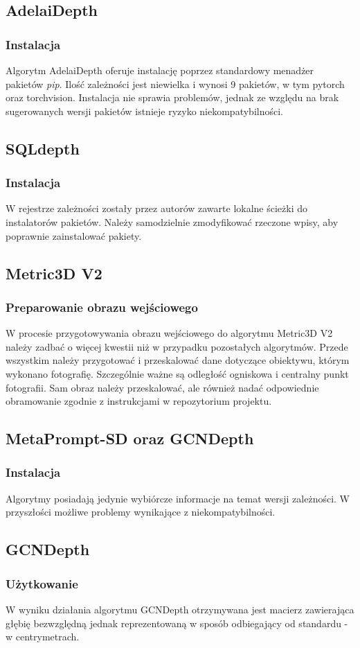 \subsection{AdelaiDepth}
\subsubsection{Instalacja}
Algorytm AdelaiDepth oferuje instalację poprzez standardowy menadżer pakietów \textit{pip}. Ilość zależności jest niewielka i wynosi 9 pakietów, w tym pytorch oraz torchvision. Instalacja nie sprawia problemów, jednak ze względu na brak sugerowanych wersji pakietów istnieje ryzyko niekompatybilności.

\subsection{SQLdepth}
\subsubsection{Instalacja}
W rejestrze zależności zostały przez autorów zawarte lokalne ścieżki do instalatorów pakietów. Należy samodzielnie zmodyfikować rzeczone wpisy, aby poprawnie zainstalować pakiety.

\subsection{Metric3D V2}
\subsubsection{Preparowanie obrazu wejściowego}
W procesie przygotowywania obrazu wejściowego do algorytmu Metric3D V2 należy zadbać o więcej kwestii niż w przypadku pozostałych algorytmów. Przede wszystkim należy przygotować i przeskalować dane dotyczące obiektywu, którym wykonano fotografię. Szczególnie ważne są odległość ogniskowa i centralny punkt fotografii. Sam obraz należy przeskalować, ale również nadać odpowiednie obramowanie zgodnie z instrukcjami w repozytorium projektu.

\subsection{MetaPrompt-SD oraz GCNDepth}
\subsubsection{Instalacja}
Algorytmy posiadają jedynie wybiórcze informacje na temat wersji zależności. W przyszłości możliwe problemy wynikające z niekompatybilności.

\subsection{GCNDepth}
\subsubsection{Użytkowanie}
W wyniku działania algorytmu GCNDepth otrzymywana jest macierz zawierająca głębię bezwzględną jednak reprezentowaną w sposób odbiegający od standardu - w centrymetrach.
